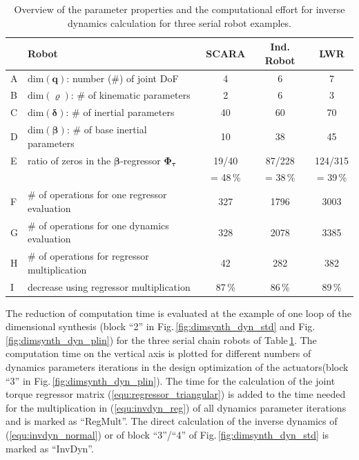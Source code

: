\documentclass{svproc}
\newcommand{\bm}[1]{\boldsymbol{#1}}
\begin{document}


\begin{table}[tb]
    \caption{Overview of the parameter properties and the computational effort for inverse dynamics calculation for three serial robot examples.}
    \label{tab:computation}
    \centering
    \setlength\tabcolsep{3pt}
    \small
    \begin{tabular}[t]{|l||l|c|c|c|} 
        \hline
         & Robot & SCARA & Ind. Robot & LWR \\
        \hline
        A & $\mathrm{dim}(\bm{q})$: number (\#) of joint DoF  & 4 & 6 & 7 \\
        B & $\mathrm{dim}(\bm{\varrho})$: \# of kinematic parameters & 2 & 6 & 3 \\
        C & $\mathrm{dim}(\bm{\delta})$: \# of inertial parameters & 40 & 60 & 70 \\
        D & $\mathrm{dim}(\bm{\beta})$: \# of base inertial parameters  & 10 & 38 & 45 \\ %
        E & ratio of zeros in the $\bm{\beta}$-regressor $\bm{\Phi}_{\bm{\tau}}$ & 19/40 & 87/228  & 124/315 \\
        &  &  = 48\,\% &  = 38\,\% &  = 39\,\% \\
        \hline
        F & \# of operations for one regressor evaluation & 327 & 1796 & 3003 \\
        \hline
        G & \# of operations for one dynamics evaluation & 328 & 2078 & 3385 \\
        H & \# of operations for regressor multiplication & 42 & 282 & 382 \\
        I & decrease using regressor multiplication & 87\,\% & 86\,\% & 89\,\% \\
        \hline
    \end{tabular}
    \vspace{-0.5cm}
\end{table}

The reduction of computation time is evaluated at the example of one loop of the dimensional synthesis (block ``2'' in Fig.\,\ref{fig:dimsynth_dyn_std} and Fig.\,\ref{fig:dimsynth_dyn_plin}) for the three serial chain robots of Table\,\ref{tab:computation}.
The computation time on the vertical axis is plotted for different numbers of dynamics parameters iterations in the design optimization of the actuators(block ``3'' in Fig.\,\ref{fig:dimsynth_dyn_plin}).
The time for the calculation of the joint torque regressor matrix (\ref{equ:regressor_triangular}) is added to the time needed for the multiplication in  (\ref{equ:invdyn_reg}) of all dynamics parameter iterations and is marked as ``RegMult''.
The direct calculation of the inverse dynamics of (\ref{equ:invdyn_normal}) or of block ``3''/``4'' of Fig.\,\ref{fig:dimsynth_dyn_std} is marked as ``InvDyn''.
\end{document}
